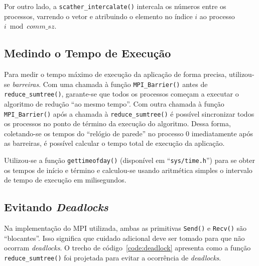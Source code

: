 \documentclass[12pt,a4paper]{article}
\begin{document}
Por outro lado, a \texttt{scather\_intercalate()} intercala os números entre os
processos, varrendo o vetor e atribuindo o elemento no índice $i$ ao processo $i
\bmod comm\_sz$. 


\subsection{Medindo o Tempo de Execução}
Para medir o tempo máximo de execução da aplicação de forma precisa, utilizou-se
\emph{barreiras}. Com uma chamada à função \texttt{MPI\_Barrier()} antes de
\texttt{reduce\_sumtree()}, garante-se que todos os processos começam a executar
o algoritmo de redução ``ao mesmo tempo''. Com outra chamada à função
\texttt{MPI\_Barrier()} após a chamada à \texttt{reduce\_sumtree()} é possível
sincronizar todos os processos no ponto de término da execução do algoritmo.
Dessa forma, coletando-se os tempos do ``relógio de parede'' no processo 0
imediatamente após as barreiras, é possível calcular o tempo total de execução
da aplicação.

Utilizou-se a função \texttt{gettimeofday()} (disponível em
``\texttt{sys/time.h}'') para se obter os tempos de início e término e
calculou-se usando aritmética simples o intervalo de tempo de execução em
milisegundos.


\subsection{Evitando \textit{Deadlocks}}
\label{sec:avoiding-deadlocks}
Na implementação do MPI utilizada, ambas as primitivas \texttt{Send()} e
\texttt{Recv()} são ``blocantes''. Isso significa que cuidado adicional deve ser
tomado para que não ocorram \textit{deadlocks}. O trecho de
código~\ref{code:deadlock} apresenta como a função \texttt{reduce\_sumtree()}
foi projetada para evitar a ocorrência de \textit{deadlocks}.
\end{document}
